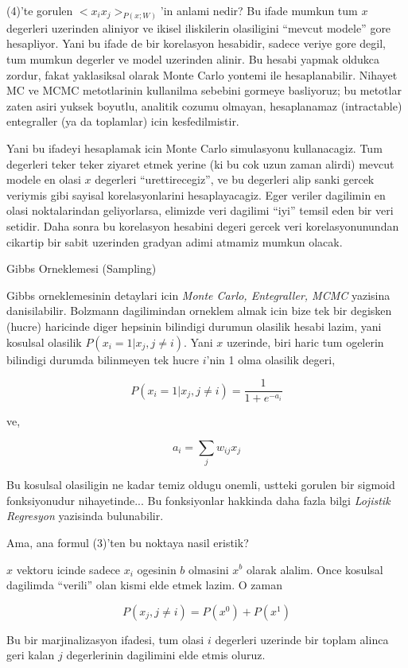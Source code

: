 \documentclass[12pt,fleqn]{article}\usepackage{../common}
\begin{document}
(4)'te gorulen $<x_ix_j>_{P(x;W)}$'in anlami nedir? Bu ifade mumkun tum $x$
degerleri uzerinden aliniyor ve ikisel iliskilerin olasiligini ``mevcut
modele'' gore hesapliyor. Yani bu ifade de bir korelasyon hesabidir, sadece
veriye gore degil, tum mumkun degerler ve model uzerinden alinir. Bu hesabi
yapmak oldukca zordur, fakat yaklasiksal olarak Monte Carlo yontemi ile
hesaplanabilir. Nihayet MC ve MCMC metotlarinin kullanilma sebebini gormeye
basliyoruz; bu metotlar zaten asiri yuksek boyutlu, analitik cozumu
olmayan, hesaplanamaz (intractable) entegraller (ya da toplamlar) icin
kesfedilmistir. 

Yani bu ifadeyi hesaplamak icin Monte Carlo simulasyonu kullanacagiz. Tum
degerleri teker teker ziyaret etmek yerine (ki bu cok uzun zaman alirdi)
mevcut modele en olasi $x$ degerleri ``urettirecegiz'', ve bu degerleri
alip sanki gercek veriymis gibi sayisal korelasyonlarini
hesaplayacagiz. Eger veriler dagilimin en olasi noktalarindan geliyorlarsa,
elimizde veri dagilimi ``iyi'' temsil eden bir veri setidir. Daha sonra bu
korelasyon hesabini degeri gercek veri korelasyonunundan cikartip bir sabit
uzerinden gradyan adimi atmamiz mumkun olacak.

Gibbs Orneklemesi (Sampling)

Gibbs orneklemesinin detaylari icin {\em Monte Carlo, Entegraller, MCMC}
yazisina danisilabilir. Bolzmann dagilimindan orneklem almak icin bize tek
bir degisken (hucre) haricinde diger hepsinin bilindigi durumun olasilik
hesabi lazim, yani kosulsal olasilik $P(x_i = 1 | x_j, j \ne i)$. Yani $x$
uzerinde, biri haric tum ogelerin bilindigi durumda bilinmeyen tek hucre
$i$'nin 1 olma olasilik degeri,

$$ P(x_i = 1 | x_j, j \ne i) = \frac{1}{1 + e^{-a_i}} $$

ve,

$$ a_i = \sum_j  w_{ij}x_j $$

Bu kosulsal olasiligin ne kadar temiz oldugu onemli, ustteki gorulen bir
sigmoid fonksiyonudur nihayetinde... Bu fonksiyonlar hakkinda daha fazla
bilgi {\em Lojistik Regresyon} yazisinda bulunabilir. 

Ama, ana formul (3)'ten bu noktaya nasil eristik?

$x$ vektoru icinde sadece $x_i$ ogesinin $b$ olmasini $x^b$ olarak
alalim. Once kosulsal dagilimda ``verili'' olan kismi elde etmek lazim. O
zaman

$$ P(x_j,j \ne i) = P(x^0) + P(x^1) $$

Bu bir marjinalizasyon ifadesi, tum olasi $i$ degerleri uzerinde bir toplam
alinca geri kalan $j$ degerlerinin dagilimini elde etmis oluruz. 
\end{document}
